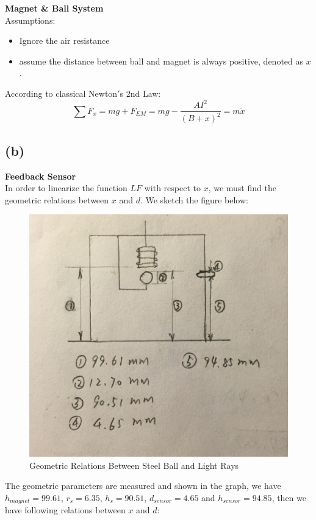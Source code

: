 \documentclass[letterpaper]{article}
\begin{document}
\textbf{\large{Magnet \& Ball System}}\\
Assumptions:
\begin{itemize}
	\item Ignore the air resistance
	\item assume the distance between ball and magnet is always positive, denoted as $x$.
\end{itemize}
According to classical Newton$\prime$s $2$nd Law:
$$ \sum F_x = mg + F_{EM} = mg -\frac{A I^2}{(B+x)^2} = m  \ddot{x}$$

\subsection*{(b)}
\textbf{\large{Feedback Sensor}}\\
In order to linearize the function $LF$ with respect to $x$, we must find the geometric relations between $x$ and $d$. We sketch the figure below:
\begin{figure}[H]
	\centering
	\includegraphics[scale=0.08]{dx_revised.jpeg}
	\caption{Geometric Relations Between Steel Ball and Light Rays}
\end{figure}
The geometric parameters are measured and shown in the graph, we have $h_{magnet} = 99.61$, $r_s = 6.35$, $h_s = 90.51$, $d_{sensor} = 4.65$ and $h_{sensor} = 94.85$, then we have following relations between $x$ and $d$:
\end{document}
